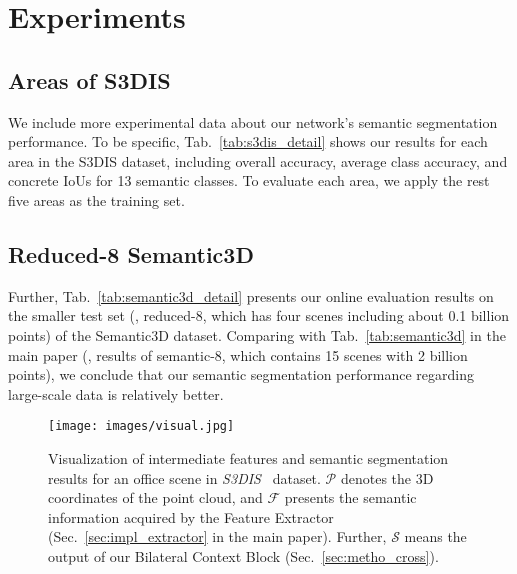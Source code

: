\documentclass[10pt,twocolumn,letterpaper]{article}
\begin{document}
\section{Experiments}
\subsection{Areas of S3DIS}
We include more experimental data about our network's semantic segmentation performance. To be specific, Tab.~\ref{tab:s3dis_detail} shows our results for each area in the S3DIS dataset, including overall accuracy, average class accuracy, and concrete IoUs for 13 semantic classes. To evaluate each area, we apply the rest five areas as the training set.

\subsection{Reduced-8 Semantic3D}
Further, Tab.~\ref{tab:semantic3d_detail} presents our online evaluation results on the smaller test set (\ie, reduced-8, which has four scenes including about 0.1 billion points) of the Semantic3D dataset. Comparing with Tab.~\ref{tab:semantic3d} in the main paper (\ie, results of semantic-8, which contains 15 scenes with 2 billion points), we conclude that our semantic segmentation performance regarding large-scale data is relatively better.

\begin{figure*}
\begin{center}
\texttt{[image: images/visual.jpg]}
\end{center}
\caption{Visualization of intermediate features and semantic segmentation results for an office scene in \emph{S3DIS}~\cite{armeni2017joint} dataset. $\mathcal{P}$ denotes the 3D coordinates of the point cloud, and $\mathcal{F}$ presents the semantic information acquired by the Feature Extractor (Sec.~\ref{sec:impl_extractor} in the main paper). Further, $\mathcal{S}$ means the output of our Bilateral Context Block (Sec.~\ref{sec:metho_cross}).}
\label{fig:vis_bilateral}
\end{figure*}
\end{document}
